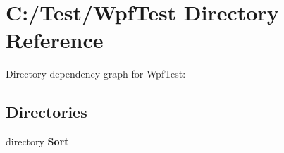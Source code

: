 \section{C\-:/\-Test/\-Wpf\-Test Directory Reference}
\label{dir_7bd9b77b4b311e5afa4b9769fb29027f}
Directory dependency graph for Wpf\-Test\-:
\subsection*{Directories}
\begin{DoxyCompactItemize}
\item 
directory {\bf Sort}
\end{DoxyCompactItemize}
